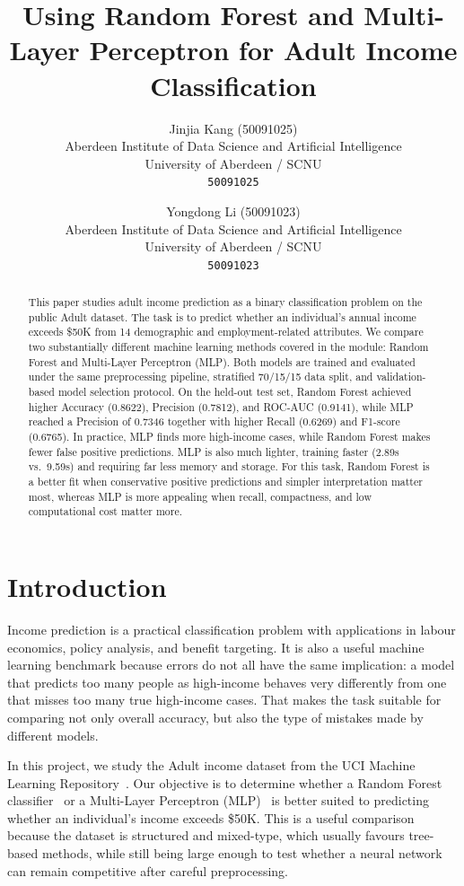 \documentclass[10pt,twocolumn,letterpaper]{article}
\title{Using Random Forest and Multi-Layer Perceptron for Adult Income Classification}
\author{
Jinjia Kang (50091025)\\
Aberdeen Institute of Data Science and Artificial Intelligence\\
University of Aberdeen / SCNU\\
{\tt\small 50091025}
\and
Yongdong Li (50091023)\\
Aberdeen Institute of Data Science and Artificial Intelligence\\
University of Aberdeen / SCNU\\
{\tt\small 50091023}
}
\begin{document}
\maketitle

\begin{abstract}
This paper studies adult income prediction as a binary classification problem on the public Adult dataset. The task is to predict whether an individual's annual income exceeds \$50K from 14 demographic and employment-related attributes. We compare two substantially different machine learning methods covered in the module: Random Forest and Multi-Layer Perceptron (MLP). Both models are trained and evaluated under the same preprocessing pipeline, stratified 70/15/15 data split, and validation-based model selection protocol. On the held-out test set, Random Forest achieved higher Accuracy (0.8622), Precision (0.7812), and ROC-AUC (0.9141), while MLP reached a Precision of 0.7346 together with higher Recall (0.6269) and F1-score (0.6765). In practice, MLP finds more high-income cases, while Random Forest makes fewer false positive predictions. MLP is also much lighter, training faster (2.89s vs.\ 9.59s) and requiring far less memory and storage. For this task, Random Forest is a better fit when conservative positive predictions and simpler interpretation matter most, whereas MLP is more appealing when recall, compactness, and low computational cost matter more.
\end{abstract}

\section{Introduction}
Income prediction is a practical classification problem with applications in labour economics, policy analysis, and benefit targeting. It is also a useful machine learning benchmark because errors do not all have the same implication: a model that predicts too many people as high-income behaves very differently from one that misses too many true high-income cases. That makes the task suitable for comparing not only overall accuracy, but also the type of mistakes made by different models.

In this project, we study the Adult income dataset from the UCI Machine Learning Repository~\cite{kohavi1996adult,uciadult}. Our objective is to determine whether a Random Forest classifier~\cite{breiman2001randomforest} or a Multi-Layer Perceptron (MLP)~\cite{rumelhart1986backprop,goodfellow2016deep} is better suited to predicting whether an individual's income exceeds \$50K. This is a useful comparison because the dataset is structured and mixed-type, which usually favours tree-based methods, while still being large enough to test whether a neural network can remain competitive after careful preprocessing.
\end{document}
